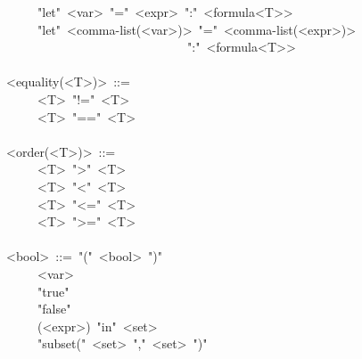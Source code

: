 \begin{footnotesize}
\begin{mdpre}
~~~~\textbar{}~"let"~{\textless{}var\textgreater{}}~"="~{\textless{}expr\textgreater{}}~":"~{\textless{}formula\textless{}T\textgreater{}\textgreater{}}\\
~~~~\textbar{}~"let"~{\textless{}comma-list(\textless{}var\textgreater{})\textgreater{}}~"="~{\textless{}comma-list(\textless{}expr\textgreater{})\textgreater{}}\\
~~~~~~~~~~~~~~~~~~~~~~~~~~~~~":"~{\textless{}formula\textless{}T\textgreater{}\textgreater{}}\\
\\
{\textless{}equality(\textless{}T\textgreater{})\textgreater{}}~::=\\
~~~~\textbar{}~{\textless{}T\textgreater{}}~"!="~{\textless{}T\textgreater{}}\\
~~~~\textbar{}~{\textless{}T\textgreater{}}~"=="~{\textless{}T\textgreater{}}\\
\\
{\textless{}order(\textless{}T\textgreater{})\textgreater{}}~::=\\
~~~~\textbar{}~{\textless{}T\textgreater{}}~"\textgreater{}"~{\textless{}T\textgreater{}}\\
~~~~\textbar{}~{\textless{}T\textgreater{}}~"\textless{}"~{\textless{}T\textgreater{}}\\
~~~~\textbar{}~{\textless{}T\textgreater{}}~"\textless{}="~{\textless{}T\textgreater{}}\\
~~~~\textbar{}~{\textless{}T\textgreater{}}~"\textgreater{}="~{\textless{}T\textgreater{}}\\
\\
{\textless{}bool\textgreater{}}~::=~"("~{\textless{}bool\textgreater{}}~")"\\
~~~~\textbar{}~{\textless{}var\textgreater{}}\\
~~~~\textbar{}~"true"\\
~~~~\textbar{}~"false"\\
~~~~\textbar{}~({\textless{}expr\textgreater{}})~"in"~{\textless{}set\textgreater{}}\\
~~~~\textbar{}~"subset("~{\textless{}set\textgreater{}}~","~{\textless{}set\textgreater{}}~")"\\

\end{mdpre}
\end{footnotesize}
